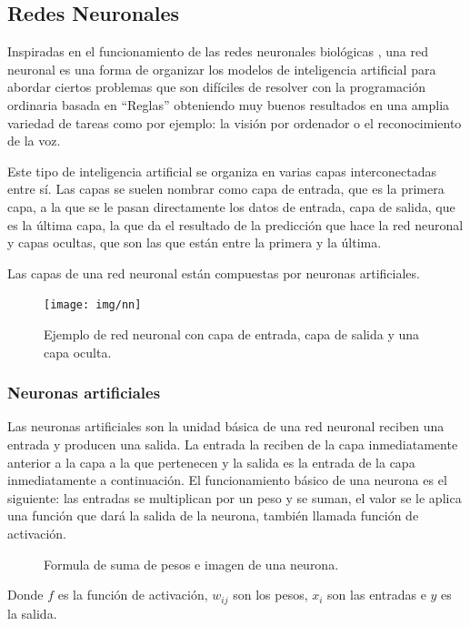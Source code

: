 \documentclass[12pt,a4paper]{article}
\begin{document}
\subsection{Redes Neuronales}
Inspiradas en el funcionamiento de las redes neuronales biológicas \cite{wiki:ann}, una red neuronal es una forma de organizar los modelos de inteligencia artificial para abordar ciertos problemas que son difíciles de resolver con la programación ordinaria basada en ``Reglas'' obteniendo muy buenos resultados en una amplia variedad de tareas como por ejemplo: la visión por ordenador o el reconocimiento de la voz.
\bigskip

Este tipo de inteligencia artificial se organiza en varias capas interconectadas entre sí. Las capas se suelen nombrar como capa de entrada, que es la primera capa, a la que se le pasan directamente los datos de entrada, capa de salida, que es la última capa, la que da el resultado de la predicción que hace la red neuronal y capas ocultas, que son las que están entre la primera y la última.
\bigskip

Las capas de una red neuronal están compuestas por neuronas artificiales.

\begin{figure}[H]
\centering
\texttt{[image: img/nn]}
\caption{Ejemplo de red neuronal con capa de entrada, capa de salida y una capa oculta.}
\end{figure}

\subsubsection{Neuronas artificiales}
Las neuronas artificiales \cite{wiki:an} son la unidad básica de una red neuronal reciben una entrada y producen una salida. La entrada la reciben de la capa inmediatamente anterior a la capa a la que pertenecen y la salida es la entrada de la capa inmediatamente a continuación. El funcionamiento básico de una neurona es el siguiente: las entradas se multiplican por un peso y se suman, el valor se le aplica una función que dará la salida de la neurona, también llamada función de activación.

\begin{figure}[H]
\centering
{}%
\qquad
{}%
\caption{Formula de suma de pesos e imagen de una neurona.}
\end{figure}

Donde $f$ es la función de activación, $w_{ij}$ son los pesos, $x_{i}$ son las entradas e $y$ es la salida.
\bigskip
\end{document}
